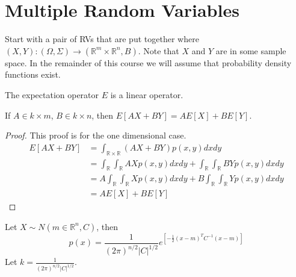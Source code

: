 \mainmatter%
\setcounter{page}{1}

\lectureseries[\course]{\course}

\date{October 1, 2009}

\setaddress%

\setcounter{lecture}{1}
\setcounter{chapter}{1}


\section{Multiple Random Variables}
Start with a pair of RVs that are put together where $(X,Y):(\Omega,\Sigma) \to (\mathbb{R}^m\times \mathbb{R}^n,B)$.
Note that $X$ and $Y$ are in some sample space.
In the remainder of this course we will assume that probability density functions exist.

\begin{theorem}
\label{th:02expectationlo}
The expectation operator $E$ is a linear operator.

If $A\in k\times m$, $B\in k\times n$, then $E[AX+BY]=AE[X]+BE[Y]$.
\end{theorem}
\begin{proof}
This proof is for the one dimensional case.
\begin{align*}
E[AX+BY] &= \int_{\mathbb{R}\times\mathbb{R}}(AX+BY)p(x,y)dxdy \\
&= \int_{\mathbb{R}}\int_{\mathbb{R}}AXp(x,y)dxdy + \int_{\mathbb{R}}\int_{\mathbb{R}}BYp(x,y)dxdy \\
&= A\int_{\mathbb{R}}\int_{\mathbb{R}}Xp(x,y)dxdy + B\int_{\mathbb{R}}\int_{\mathbb{R}}Yp(x,y)dxdy \\
&= AE[X] + BE[Y]
\end{align*}
\end{proof}

Let $X\sim N(m\in\mathbb{R}^n,C)$, then
$$p(x)=\frac{1}{{(2\pi)}^{n/2}|C|^{1/2}}e^{\left[-\frac{1}{2}{(x-m)}^T C^{-1}(x-m)\right]}$$
Let $k=\frac{1}{{(2\pi)}^{n/2}|C|^{1/2}}$.

